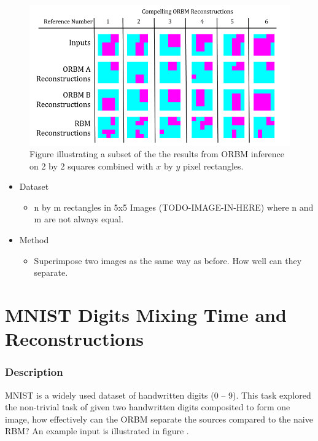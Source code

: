     \begin{figure}[htb]
      \begin{center}
        \includegraphics[width=\textwidth]{Assets/results/rect-sq-orbm-results.png}
      \end{center}
      \caption{Figure illustrating a subset of the the results from ORBM inference on 2 by 2 squares combined with $x$ by $y$ pixel rectangles.}
      \label{F:rect-orbm-results}
    \end{figure}


    \begin{itemize}
      \item Dataset
      \begin{itemize}
        \item n by m rectangles in 5x5 Images (TODO-IMAGE-IN-HERE) where n and m are not always equal.
      \end{itemize}
      \item Method
      \begin{itemize}
        \item Superimpose two images as the same way as before. How well can they separate.
      \end{itemize}
    \end{itemize}

    \section{MNIST Digits Mixing Time and Reconstructions}

    \subsubsection{Description}
    MNIST is a widely used dataset of handwritten digits (0 -- 9). This task explored the non-trivial task of given two handwritten digits composited to form one image, how effectively can the ORBM separate the sources compared to the naive RBM? An example input is illustrated in figure .
